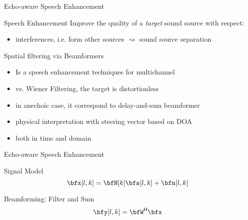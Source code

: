 \begin{frame}{Echo-aware Speech Enhancement}
    \begin{block}{Speech Enhancement}
        Improve the quality of a \textit{target} sound source with respect:
        \begin{itemize}
            \item interferences, i.e. form other sources $\rightsquigarrow$ sound source separation
        \end{itemize}
    \end{block}

    \begin{block}{Spatial filtering via Beamformers}
        \begin{itemize}
            \item Is a speech enhancement techniques for multichannel
            \item vs. Wiener Filtering, the target is distortionless
            \item in anechoic case, it correspond to delay-and-sum beamformer
            \item physical interpretation with steering vector based on DOA
            \item both in time and  domain
        \end{itemize}
    \end{block}

\end{frame}

\begin{frame}[t]{Echo-aware Speech Enhancement}

    \begin{block}{Signal Model}
        \begin{equation*}
            \bfx[l,k] =\bfH[k] \bfs[l,k] + \bfn[l,k]
        \end{equation*}
    \end{block}

    \begin{mydefblock}{Beamforming: Filter and Sum}
        \begin{equation*}
            \begin{aligned}
                \bfy[l,k] = \khermitian{\bfW} \bfx
            \end{aligned}
        \end{equation*}
    \end{mydefblock}


\end{frame}

